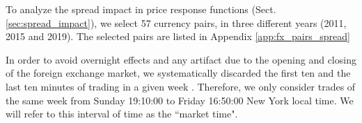 To analyze the spread impact in price response functions (Sect.
\ref{sec:spread_impact}), we select 57 currency pairs, in three different years
(2011, 2015 and 2019). The selected pairs are listed in Appendix
\ref{app:fx_pairs_spread}

In order to avoid overnight effects and any artifact due to the opening and
closing of the foreign exchange market, we systematically discarded the first
ten and the last ten minutes of trading in a given week
\cite{Bouchaud_2004,large_prices_changes,spread_changes_affect,Wang_2016_cross,my_paper_response_financial}.
Therefore, we only consider trades of the same week from Sunday 19:10:00 to
Friday 16:50:00 New York local time. We will refer to this interval of time as
the ``market time".
